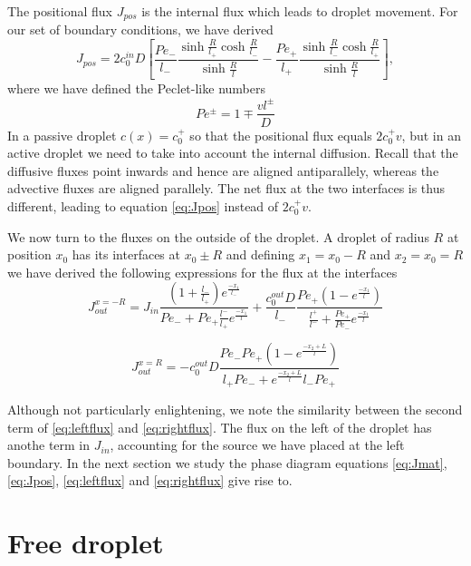 \documentclass{Dissertate}
\begin{document}
The positional flux \(J_{pos}\) is the internal flux which leads to
droplet movement. For our set of boundary conditions, we have derived
\begin{equation}
J_{pos} = 2c_0^{in}D\left[\frac{Pe_-}{l_-}\frac{\sinh\frac{R}{l_+}\cosh\frac{R}{l_-}}{\sinh\frac{R}{l}}-\frac{Pe_+}{l_+}\frac{\sinh\frac{R}{l_-}\cosh\frac{R}{l_+}}{\sinh\frac{R}{l}}\right],
\label{eq:Jpos}\end{equation} where we have defined the Peclet-like
numbers \[
Pe^\pm = 1 \mp \frac{vl^\pm}{D}
\] In a passive droplet \(c(x)=c_0^+\) so that the positional flux
equals \(2c_0^+v\), but in an active droplet we need to take into
account the internal diffusion. Recall that the diffusive fluxes point
inwards and hence are aligned antiparallely, whereas the advective
fluxes are aligned parallely. The net flux at the two interfaces is thus
different, leading to equation \ref{eq:Jpos} instead of \(2c_0^+v\).

We now turn to the fluxes on the outside of the droplet. A droplet of
radius \(R\) at position \(x_0\) has its interfaces at \(x_0 \pm R\) and
defining \(x_1=x_0-R\) and \(x_2=x_0=R\) we have derived the following
expressions for the flux at the interfaces \begin{equation}
J_{out}^{x=-R} = J_{in}\frac{(1+\frac{l_-}{l_+})e^{\frac{-x_1}{l_-}}}{Pe_-+Pe_+\frac{l^-}{l_+}e^{\frac{-x_1}{l}}}
+\frac{c_0^{out}D}{l_-}\frac{Pe_+(1-e^{\frac{-x_1}{l}})}{\frac{l^+}{l^-}+\frac{Pe_+}{Pe_-}e^{\frac{-x_1}{l}}}
\label{eq:leftflux}\end{equation}

\begin{equation}
J_{out}^{x=R} = -c_0^{out}D\frac{Pe_-Pe_+(1-e^{\frac{-x_2+L}{l}})}{l_+Pe_-+e^{\frac{-x_2+L}{l}}l_-Pe_+}
\label{eq:rightflux}\end{equation}

Although not particularly enlightening, we note the similarity between
the second term of \ref{eq:leftflux} and \ref{eq:rightflux}. The
flux on the left of the droplet has anothe term in \(J_{in}\),
accounting for the source we have placed at the left boundary. In the
next section we study the phase diagram equations \ref{eq:Jmat},
\ref{eq:Jpos}, \ref{eq:leftflux} and \ref{eq:rightflux} give
rise to.

\hypertarget{free-droplet}{%
\section{Free droplet}\label{free-droplet}}
\end{document}
